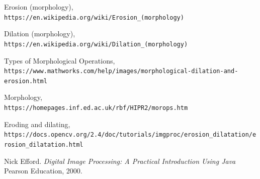 \documentclass{article}
\begin{document}
\begin{thebibliography}{}
Erosion (morphology),
\\\texttt{https://en.wikipedia.org/wiki/Erosion_(morphology)}

Dilation (morphology),
\\\texttt{https://en.wikipedia.org/wiki/Dilation_(morphology)}

Types of Morphological Operations,
\\\texttt{https://www.mathworks.com/help/images/morphological-dilation-and-erosion.html}

Morphology,
\\\texttt{https://homepages.inf.ed.ac.uk/rbf/HIPR2/morops.htm}

Eroding and dilating,
\\\texttt{https://docs.opencv.org/2.4/doc/tutorials/imgproc/erosion_dilatation/erosion_dilatation.html}

Nick Efford. 
\textit{Digital Image Processing: A Practical Introduction Using Java} 
Pearson Education, 2000.

\end{thebibliography}
\end{document}
